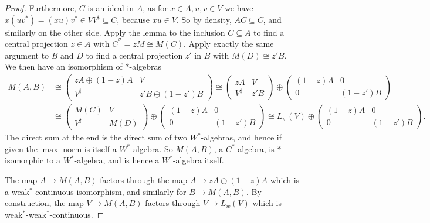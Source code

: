 \documentclass[a4paper,11pt]{article}
\theoremstyle{plain}
\theoremstyle{remark}
\begin{document}
\begin{proof}
Furthermore, $C$ is an ideal in $A$, as for $x\in A, u,v\in V$ we have $x(uv^*) = (xu)v^* \in VV^\sharp \subseteq C$, because $xu \in V$.  So by density, $AC \subseteq C$, and similarly on the other side.  Apply the lemma to the inclusion $C \subseteq A$ to find a central projection $z\in A$ with $\overline{C}^\sigma = zM \cong M(C)$.  Apply exactly the same argument to $B$ and $D$ to find a central projection $z'$ in $B$ with $M(D) \cong z'B$.  We then have an isomorphism of $*$-algebras
\begin{align*}
M(A,B)
&\cong \begin{pmatrix} zA \oplus (1-z)A & V \\ V^\sharp & z'B \oplus (1-z')B \end{pmatrix}
\cong \begin{pmatrix} zA & V \\ V^\sharp & z'B \end{pmatrix}
   \oplus \begin{pmatrix} (1-z)A & 0 \\ 0 & (1-z')B \end{pmatrix} \\
&\cong \begin{pmatrix} M(C) & V \\ V^\sharp & M(D) \end{pmatrix}
   \oplus \begin{pmatrix} (1-z)A & 0 \\ 0 & (1-z')B \end{pmatrix}
\cong L_w(V) \oplus \begin{pmatrix} (1-z)A & 0 \\ 0 & (1-z')B \end{pmatrix}.
\end{align*}
The direct sum at the end is the direct sum of two $W^*$-algebras, and hence if given the $\max$ norm is itself a $W^*$-algebra.  So $M(A,B)$, a $C^*$-algebra, is $*$-isomorphic to a $W^*$-algebra, and is hence a $W^*$-algebra itself.

The map $A \to M(A,B)$ factors through the map $A \to zA \oplus (1-z)A$ which is a weak$^*$-continuous isomorphism, and similarly for $B\to M(A,B)$.  By construction, the map $V \to M(A,B)$ factors through $V\to L_w(V)$ which is weak$^*$-weak$^*$-continuous.


\end{proof}
\end{document}
